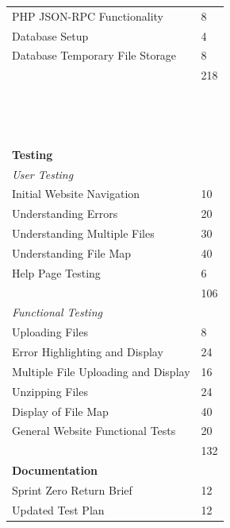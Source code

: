 \documentclass[12pt]{article}
\begin{document}
\begin{longtable}{|l|l|}
    PHP JSON-RPC Functionality           & 8             \\
    Database Setup                       & 4             \\
    Database Temporary File Storage      & 8             \\
    \hline
    ~                                    & 218           \\
    \hline
    ~                                    & ~             \\
    ~                                    & ~             \\
    ~                                    & ~             \\
    {\bf Testing}                        & ~             \\
    {\em User Testing}                   & ~             \\
    Initial Website Navigation           & 10            \\
    Understanding Errors                 & 20            \\
    Understanding Multiple Files         & 30            \\
    Understanding File Map               & 40            \\
    Help Page Testing                    & 6             \\
    \hline
    ~                                    & 106           \\
    \hline
    {\em Functional Testing}             & ~             \\
    Uploading Files                      & 8             \\
    Error Highlighting and Display       & 24            \\
    Multiple File Uploading and Display  & 16            \\
    Unzipping Files                      & 24            \\
    Display of File Map                  & 40            \\
    General Website Functional Tests     & 20            \\
    \hline
    ~                                    & 132           \\
    \hline
    {\bf Documentation}                  & ~             \\
    Sprint Zero Return Brief             & 12            \\
    Updated Test Plan                    & 12            \\

\end{longtable}
\end{document}
